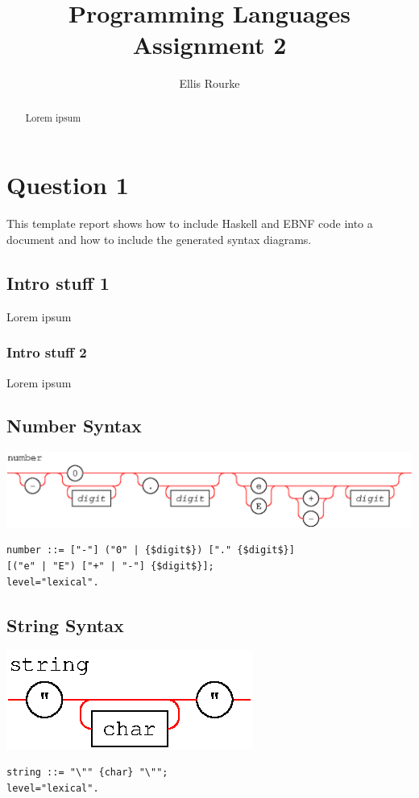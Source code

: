 \documentclass[a4paper]{article}
\begin{document}
\title{Programming Languages Assignment 2}

\author{Ellis Rourke}

\maketitle

\begin{abstract}
   Lorem ipsum
\end{abstract}

\section{Question 1}


This template report shows how to include Haskell and EBNF code into a document
and how to include the generated syntax diagrams. 



\subsection{Intro stuff 1}

Lorem ipsum 

\subsubsection{Intro stuff 2}

Lorem ipsum 



\subsection{Number Syntax}
{\centering
	\includegraphics[scale=0.9]{Question1/number.eps}
}
\begin{lstlisting}[frame=single]
number ::= ["-"] ("0" | {$digit$}) ["." {$digit$}] 
[("e" | "E") ["+" | "-"] {$digit$}];
level="lexical".

\end{lstlisting}

\subsection{String Syntax}
{\centering
	\includegraphics[scale=0.9]{Question1/string.eps}
}
\begin{lstlisting}[frame=single]
string ::= "\"" {char} "\"";
level="lexical".
\end{lstlisting}
\end{document}
